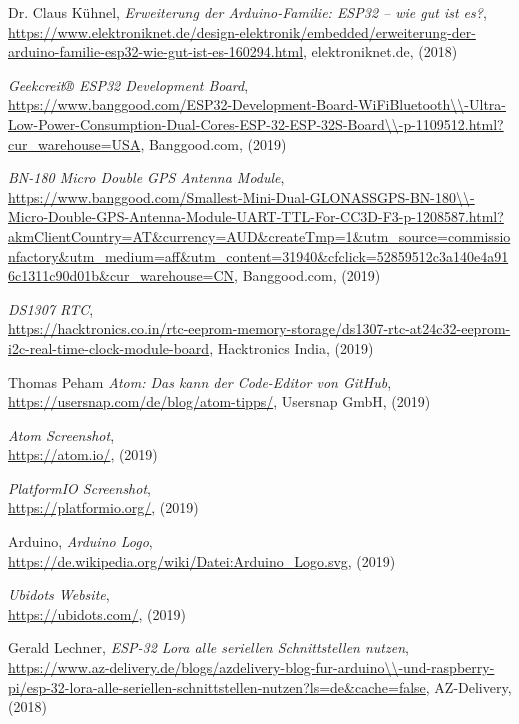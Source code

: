 \begin{thebibliography}{99}
%
 Dr. Claus Kühnel,
\emph{Erweiterung der Arduino-Familie: ESP32 – wie gut ist es?}, \\
\url{https://www.elektroniknet.de/design-elektronik/embedded/erweiterung-der-arduino-familie-esp32-wie-gut-ist-es-160294.html}, elektroniknet.de, (2018)

%
\emph{Geekcreit® ESP32 Development Board}, \\
\url{https://www.banggood.com/ESP32-Development-Board-WiFiBluetooth\\-Ultra-Low-Power-Consumption-Dual-Cores-ESP-32-ESP-32S-Board\\-p-1109512.html?cur_warehouse=USA}, Banggood.com, (2019)

%
\emph{BN-180 Micro Double GPS Antenna Module}, \\
\url{https://www.banggood.com/Smallest-Mini-Dual-GLONASSGPS-BN-180\\-Micro-Double-GPS-Antenna-Module-UART-TTL-For-CC3D-F3-p-1208587.html?akmClientCountry=AT&currency=AUD&createTmp=1&utm_source=commissionfactory&utm_medium=aff&utm_content=31940&cfclick=52859512c3a140e4a916c1311c90d01b&cur_warehouse=CN}, Banggood.com, (2019)

%
\emph{DS1307 RTC}, \\
\url{https://hacktronics.co.in/rtc-eeprom-memory-storage/ds1307-rtc-at24c32-eeprom-i2c-real-time-clock-module-board}, Hacktronics India, (2019)

%
  Thomas Peham 
\emph{Atom: Das kann der Code-Editor von GitHub}, \\
\url{https://usersnap.com/de/blog/atom-tipps/}, Usersnap GmbH, (2019)

%
\emph{Atom Screenshot}, \\
\url{https://atom.io/}, (2019)

%
\emph{PlatformIO Screenshot}, \\
\url{https://platformio.org/}, (2019)

%
 Arduino,
\emph{Arduino Logo}, \\
\url{https://de.wikipedia.org/wiki/Datei:Arduino_Logo.svg}, (2019)

%
\emph{Ubidots Website}, \\
\url{https://ubidots.com/}, (2019)

%
 Gerald Lechner, 
\emph{ESP-32 Lora alle seriellen Schnittstellen nutzen}, \\
\url{https://www.az-delivery.de/blogs/azdelivery-blog-fur-arduino\\-und-raspberry-pi/esp-32-lora-alle-seriellen-schnittstellen-nutzen?ls=de&cache=false}, AZ-Delivery, (2018)


\end{thebibliography}
